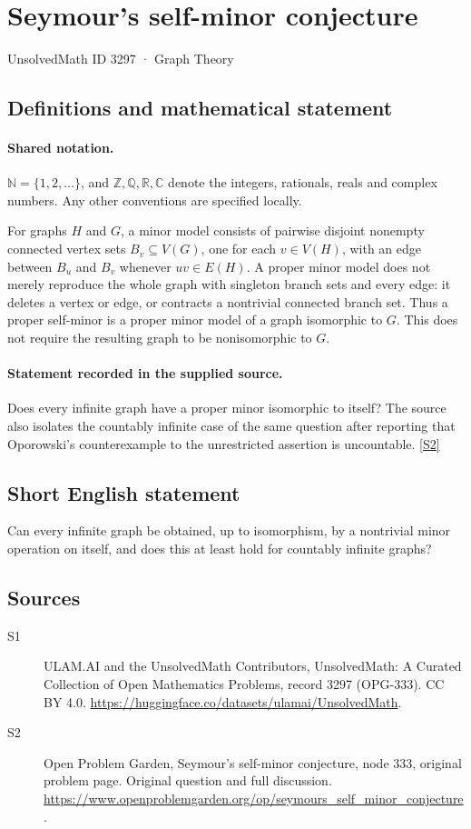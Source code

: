 \documentclass[11pt]{article}
\newcommand{\sref}[2]{\hyperlink{source:#1:#2}{[S#2]}}
\begin{document}
\setcounter{section}{3296}
\section{Seymour's self-minor conjecture}\label{3297}
{\small\sffamily UnsolvedMath ID 3297 · Graph Theory}
\subsection{Definitions and mathematical statement}

\paragraph{Shared notation.}$\mathbb N=\{1,2,\ldots\}$, and $\mathbb Z,\mathbb Q,\mathbb R,\mathbb C$ denote the integers, rationals, reals and complex numbers. Any other conventions are specified locally.


For graphs $H$ and $G$, a minor model consists of pairwise disjoint nonempty connected vertex sets $B_v\subseteq V(G)$, one for each $v\in V(H)$, with an edge between $B_u$ and $B_v$ whenever $uv\in E(H)$. A proper minor model does not merely reproduce the whole graph with singleton branch sets and every edge: it deletes a vertex or edge, or contracts a nontrivial connected branch set. Thus a proper self-minor is a proper minor model of a graph isomorphic to $G$. This does not require the resulting graph to be nonisomorphic to $G$.
\paragraph{Statement recorded in the supplied source.}
Does every infinite graph have a proper minor isomorphic to itself? The source also isolates the countably infinite case of the same question after reporting that Oporowski's counterexample to the unrestricted assertion is uncountable. \sref{3297}{2}
\subsection{Short English statement}
Can every infinite graph be obtained, up to isomorphism, by a nontrivial minor operation on itself, and does this at least hold for countably infinite graphs?
\subsection{Sources}
\begin{description}
\item[\hypertarget{source:3297:1}{S1}] ULAM.AI and the UnsolvedMath Contributors, UnsolvedMath: A Curated Collection of Open Mathematics Problems, record 3297 (OPG-333). CC BY 4.0. \url{https://huggingface.co/datasets/ulamai/UnsolvedMath}.
\item[\hypertarget{source:3297:2}{S2}] Open Problem Garden, Seymour's self-minor conjecture, node 333, original problem page. Original question and full discussion. \url{https://www.openproblemgarden.org/op/seymours_self_minor_conjecture}.

\end{description}
\label{end:3297}
\end{document}
